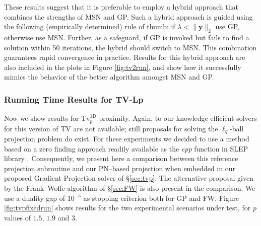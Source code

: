 \documentclass[twoside,11pt]{article}
\newcommand{\vy}{\bm{y}}       \newcommand{\vyh}{\hat{\bm{y}}}        \newcommand{\yh}{\hat{y}}    \newcommand{\vyt}{\tilde{\bm{y}}}       \newcommand{\yt}{\tilde{y}}
\newcommand{\mynorm}[2]{\| {#1} \|_{#2}}
\newcommand{\enorm}[1]{\mynorm{#1}{2}}
\newcommand{\tvell}{\text{Tv}}
\newcommand{\oned}{\text{1D}}
\numberwithin{equation}{section}
\numberwithin{theorem}{section}
\begin{document}
These results suggest that it is preferable to employ a hybrid approach that combines the strengths of MSN and GP. Such a hybrid approach is guided using the following (empirically determined) rule of thumb: if $\lambda < \enorm{\vy}$ use GP, otherwise use MSN. Further, as a safeguard, if GP is invoked but fails to find a solution within 50 iterations, the hybrid should switch to MSN. This combination guarantees rapid convergence in practice. Results for this hybrid approach are also included in the plots in Figure \ref{fig:tv2run}, and show how it successfully mimics the behavior of the better algorithm amongst MSN and GP.

\subsubsection{Running Time Results for TV-Lp}
\label{sec:exptvlp}

Now we show results for $\tvell_p^{\oned}$ proximity. Again, to our knowledge efficient solvers for this version of TV are not available; still proposals for solving the $\ell_q$-ball projection problem do exist. For these experiments we decided to use a method based on a zero finding approach readily available as the {\it epp} function in SLEP library \citep{slep}. Consequently, we present here a comparison between this reference projection subroutine and our PN--based projection when embedded in our proposed Gradient Projection solver of \S\ref{sec:tvp}. The alternative proposal given by the Frank--Wolfe algorithm of \S\ref{sec:FW} is also present in the comparison. We use a duality gap of $10^{-5}$ as stopping criterion both for GP and FW. Figure \ref{fig:tvpfixedrun} shows results for the two experimental scenarios under test, for $p$ values of $1.5$, $1.9$ and $3$.
\end{document}
